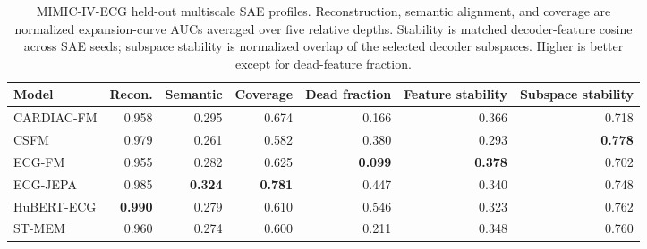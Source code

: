 \begin{table}[t]
  \centering
  \small
  \caption{MIMIC-IV-ECG held-out multiscale SAE profiles. Reconstruction, semantic alignment, and coverage are normalized expansion-curve AUCs averaged over five relative depths. Stability is matched decoder-feature cosine across SAE seeds; subspace stability is normalized overlap of the selected decoder subspaces. Higher is better except for dead-feature fraction.}
  \label{tab:mimic-model-profiles}
  \begin{tabular}{lrrrrrr}
    \toprule
    Model & Recon. & Semantic & Coverage & Dead fraction & Feature stability & Subspace stability \\
    \midrule
    CARDIAC-FM & 0.958 & 0.295 & 0.674 & 0.166 & 0.366 & 0.718 \\
    CSFM       & 0.979 & 0.261 & 0.582 & 0.380 & 0.293 & \textbf{0.778} \\
    ECG-FM     & 0.955 & 0.282 & 0.625 & \textbf{0.099} & \textbf{0.378} & 0.702 \\
    ECG-JEPA   & 0.985 & \textbf{0.324} & \textbf{0.781} & 0.447 & 0.340 & 0.748 \\
    HuBERT-ECG & \textbf{0.990} & 0.279 & 0.610 & 0.546 & 0.323 & 0.762 \\
    ST-MEM     & 0.960 & 0.274 & 0.600 & 0.211 & 0.348 & 0.760 \\
    \bottomrule
  \end{tabular}
\end{table}
